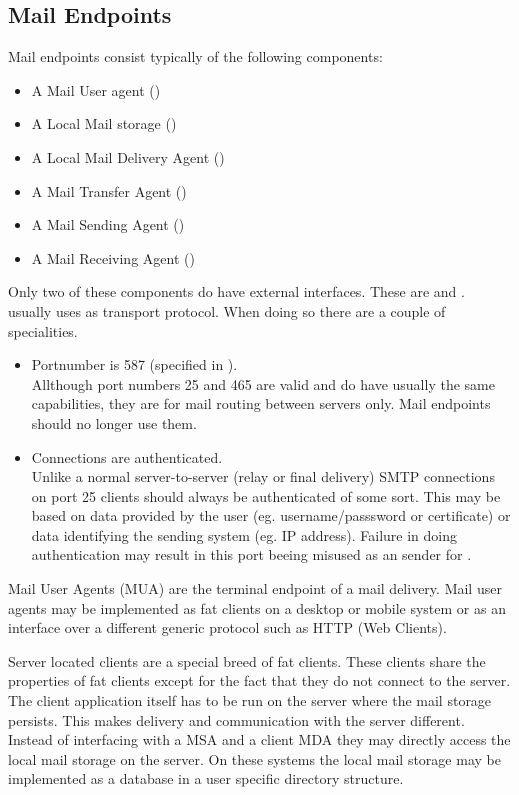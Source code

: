 \subsection{Mail Endpoints}
Mail endpoints consist typically of the following components:
\begin{itemize}
	\item A Mail User agent ()
	\item A Local Mail storage ()
	\item A Local Mail Delivery Agent ()
	\item A Mail Transfer Agent ()
	\item A Mail Sending Agent ()
	\item A Mail Receiving Agent ()
\end{itemize}

Only two of these components do have external interfaces. These are  and .  usually uses  as transport protocol. When doing so there are a couple of specialities. 
\begin{itemize}
	\item Portnumber is 587 (specified in \cite{RFC4409}).\\
	Allthough port numbers 25 and 465 are valid and do have usually the same capabilities, they are for mail routing between servers only. Mail endpoints should no longer use them.
	\item Connections are authenticated.\\
	Unlike a normal server-to-server (relay or final delivery) SMTP connections on port 25 clients should always be authenticated of some sort. This may be based on data provided by the user (eg. username/passsword or certificate) or data identifying the sending system (eg. IP address)\cite{RFC4409}. Failure in doing authentication may result in this port beeing misused as an sender for .
\end{itemize}

Mail User Agents (MUA) are the terminal endpoint of a mail delivery. Mail user agents may be implemented as fat clients on a desktop or mobile system or as an interface over a different generic protocol such as HTTP (Web Clients). \par

Server located clients are a special breed of fat clients. These clients share the properties of fat clients except for the fact that they do not connect to the server. The client application itself has to be run on the server where the mail storage persists. This makes delivery and communication with the server different. Instead of interfacing with a MSA and a client MDA they may directly access the local mail storage on the server. On these systems the local mail storage may be implemented as a database in a user specific directory structure.


